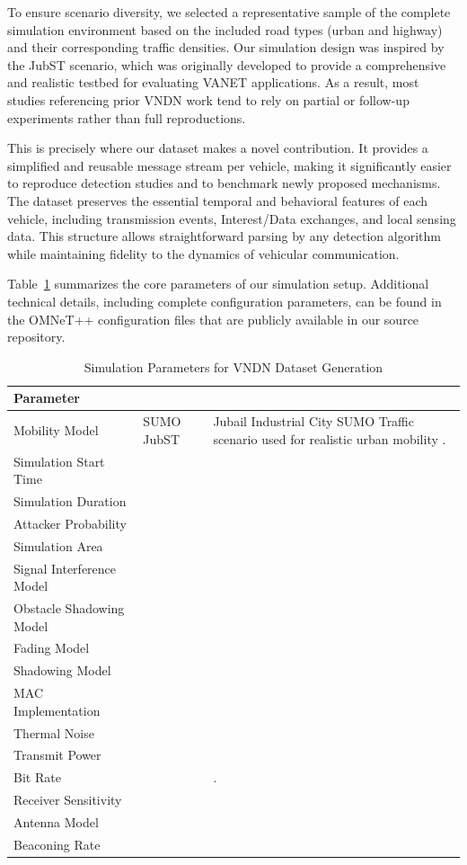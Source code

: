 \documentclass[journal,comsoc]{IEEEtran}
\begin{document}
To ensure scenario diversity, we selected a representative sample of the complete simulation environment based on the included road types (urban and highway) and their corresponding traffic densities. Our simulation design was inspired by the JubST scenario, which was originally developed to provide a comprehensive and realistic testbed for evaluating VANET applications. As a result, most studies referencing prior VNDN work tend to rely on partial or follow-up experiments rather than full reproductions.

This is precisely where our dataset makes a novel contribution. It provides a simplified and reusable message stream per vehicle, making it significantly easier to reproduce detection studies and to benchmark newly proposed mechanisms. The dataset preserves the essential temporal and behavioral features of each vehicle, including transmission events, Interest/Data exchanges, and local sensing data. This structure allows straightforward parsing by any detection algorithm while maintaining fidelity to the dynamics of vehicular communication. 

Table~\ref{tab:simulation_parameters} summarizes the core parameters of our simulation setup. Additional technical details, including complete configuration parameters, can be found in the OMNeT++ configuration files that are publicly available in our source repository.
\begin{table}[!t]
\centering
\caption{Simulation Parameters for VNDN Dataset Generation}
\label{tab:simulation_parameters}
\begin{tabular}{|p{5cm}|p{4cm}|p{5.5cm}|}
\hline
Parameter & & \\ \hline
Mobility Model & SUMO JubST  & Jubail Industrial City  SUMO Traffic scenario used for realistic urban mobility \cite{}. \\ \hline
Simulation Start Time & & \\ \hline
Simulation Duration & & \\ \hline
Attacker Probability & & \\ \hline
Simulation Area & & \\ \hline
Signal Interference Model & & \\ \hline
Obstacle Shadowing Model & &\\ \hline
Fading Model & & \\ \hline
Shadowing Model & & \\ \hline
MAC Implementation & & \\ \hline
Thermal Noise & & \\ \hline
Transmit Power& & \\ \hline
Bit Rate & &. \\ \hline
Receiver Sensitivity& & \\ \hline
Antenna Model & & \\ \hline
Beaconing Rate & & \\ \hline
\end{tabular}
\end{table}
\end{document}
